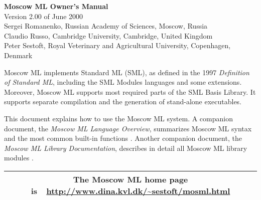 \documentclass[fleqn,a4paper]{article}
\begin{document}
\begin{center}

  {\huge\bf Moscow ML Owner's Manual}\\[0.5cm]

Version 2.00 of June 2000\\[0.5cm]

Sergei Romanenko, Russian Academy of Sciences, Moscow, Russia\\
Claudio Russo, Cambridge University, Cambridge, United Kingdom\\
Peter Sestoft, Royal Veterinary and Agricultural University, 
Copenhagen, Denmark

\end{center}

\vspace{0.5cm}

\noindent 
Moscow ML implements Standard ML (SML), as defined in the 1997 {\em
  Definition of Standard ML\/}, including the SML Modules languages
and some extensions.  Moreover, Moscow ML supports most required parts
of the SML Basis Library.  It supports separate compilation and the
generation of stand-alone executables.

This document explains how to use the Moscow ML system.  A companion
document, the {\em Moscow ML Language Overview\/}, summarizes Moscow
ML syntax and the most common built-in functions
\cite{MoscowML:2000:MoscowMLLanguage}.  Another companion document,
the \emph{Moscow ML Library Documentation}, describes in detail all
Moscow ML library modules \cite{MoscowML:2000:MoscowMLLibrary}. 

\vspace{0.5cm}

\tableofcontents

\vfill

\begin{center}
\begin{tabular}{|c|}\hline
\rule[-0.4cm]{0cm}{1cm}The Moscow ML home page is\ \
    \url{http://www.dina.kvl.dk/~sestoft/mosml.html}\\\hline
\end{tabular}
\end{center}
\end{document}
